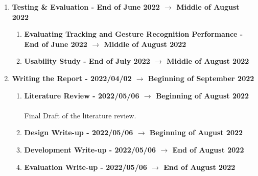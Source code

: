 \begin{enumerate}
\begin{enumerate}
        \end{enumerate}
    \item \label{itm:testing} \textbf{Testing \& Evaluation - End of June 2022 $\rightarrow$ Middle of August 2022}
        \begin{enumerate}
            \item \label{itm:performance} \textbf{Evaluating Tracking and Gesture Recognition Performance - End of June 2022 $\rightarrow$ Middle of August 2022}\\
            \item \label{itm:usability} \textbf{Usability Study - End of July 2022 $\rightarrow$ Middle of August 2022}\\
        \end{enumerate}
    \item \label{itm:report} \textbf{Writing the Report - 2022/04/02 $\rightarrow$ Beginning of September 2022}
        \begin{enumerate}
            \item \label{itm:lit_review_final} \textbf{Literature Review - 2022/05/06  $\rightarrow$ Beginning of August 2022}\\
                \\
                Final Draft of the literature review.
            \item \label{itm:design_write} \textbf{Design Write-up - 2022/05/06  $\rightarrow$ Beginning of August 2022}\\
            \item \label{itm:dev_write} \textbf{Development Write-up - 2022/05/06  $\rightarrow$ End of August 2022}\\
            \item \label{itm:eval_write} \textbf{Evaluation Write-up - 2022/05/06  $\rightarrow$ End of August 2022}\\

\end{enumerate}
\end{enumerate}
